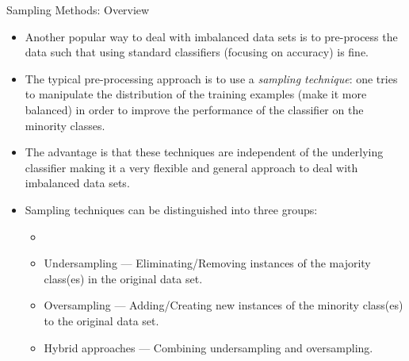 	\begin{frame}{Sampling Methods: Overview}
		\footnotesize
		\begin{itemize}
			\item Another popular way to deal with imbalanced data sets is to pre-process the data such that using standard classifiers (focusing on accuracy) is fine.
%			
			\item The typical pre-processing approach is to use a \emph{sampling technique}: one tries to manipulate the distribution of the training examples (make it more balanced) in order to improve the performance of the classifier on the minority classes.
			\item The advantage is that these techniques are independent of the underlying classifier making it a very flexible and general approach to deal with imbalanced data sets.
			\item Sampling techniques can be distinguished into three groups: \lz
			\begin{minipage}{0.5\textwidth}
%	
				\begin{itemize} \footnotesize
					\item[]
%					
					\item Undersampling --- Eliminating/Removing instances of the majority class(es) in the original data set.
					\item Oversampling --- Adding/Creating new instances of the minority class(es) to the original data set.
					\item Hybrid approaches --- Combining undersampling and oversampling.
				\end{itemize}
			\end{minipage}
			\begin{minipage}{0.4\textwidth}
					\begin{figure}
					\centering
				\end{figure}
			\end{minipage}
		\end{itemize}
		

\end{frame}
